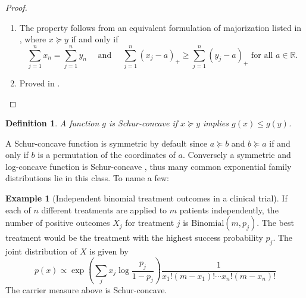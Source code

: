 \documentclass[11pt]{article}
\newtheorem{definition}{Definition}
\theoremstyle{definition}
\newtheorem{example}{Example}
\theoremstyle{custom}
\newcommand{\RR}{\mathbb{R}}
\begin{document}
\begin{proof}~\\
\begin{enumerate}
\item The property follows from an equivalent formulation of majorization listed in \citet{Marshall:2010hb}, where $x \succeq y$ if and only if
$$\sum_{j=1}^n x_n = \sum_{j=1}^n y_n \quad \text{ and } \quad \sum_{j=1}^n \left(x_j - a\right)_+ \ge \sum_{j=1}^n \left(y_j - a\right)_+ \text{ for all } a \in \RR.$$

\item Proved in \citet{Marshall:2010hb}. \qedhere
\end{enumerate}
\end{proof}

\begin{definition}
A function $g$ is Schur-concave if $x \succeq y$ implies $g\left(x\right) \le g\left(y\right)$.
\end{definition}

A Schur-concave function is symmetric by default since $a \succeq b$ and $b \succeq a$ if and only if $b$ is a permutation of the coordinates of $a$. Conversely a symmetric and log-concave function is Schur-concave \citep{Marshall:2010hb}, thus many common exponential family distributions lie in this class. To name a few:

\begin{example}[Independent binomial treatment outcomes in a clinical trial]
 If each of $n$ different treatments are applied to $m$ patients independently, the number of positive outcomes $X_j$ for treatment $j$ is $\text{Binomial}\left(m, p_j\right)$. The best treatment would be the treatment with the highest success probability $p_j$. The joint distribution of $X$ is given by
$$p\left(x\right) \propto \exp\left(\sum_j x_j \log\frac{p_j}{1-p_j}\right) \frac{1}{x_1! \left(m-x_1\right)! \cdots x_n! \left(m-x_n\right)!}$$
The carrier measure above is Schur-concave.
\end{example}
\end{document}
